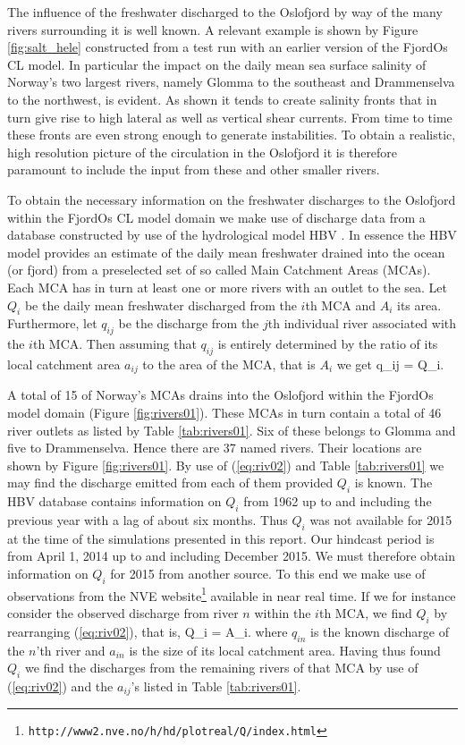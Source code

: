 The influence of the freshwater discharged to the Oslofjord by way of the many rivers surrounding it is well known. A relevant example is shown by Figure \ref{fig:salt_hele} constructed from a test run with an earlier version of the FjordOs CL model. In particular the impact on the daily mean sea surface salinity of Norway's two largest rivers, namely Glomma to the southeast and Drammenselva to the northwest, is evident. As shown it tends to create salinity fronts that in turn give rise to high lateral as well as vertical shear currents. From time to time these fronts are even strong enough to generate instabilities. To obtain a realistic, high resolution picture of the circulation in the Oslofjord it is therefore paramount to include the input from these and other smaller rivers.
 

To obtain the necessary information on the freshwater discharges to the Oslofjord within the FjordOs CL model domain we make use of discharge data from a database constructed by use of the hydrological model HBV \citep{beldr:etal:2003}. In essence the HBV model provides an estimate of the daily mean freshwater drained into the ocean (or fjord) from a preselected set of so called Main Catchment Areas (MCAs). Each MCA has in turn at least one or more rivers with an outlet to the sea. Let $Q_i$ be the daily mean freshwater discharged from the $i$th MCA and $A_i$ its area. Furthermore, let $q_{ij}$ be the discharge from the $j$th individual river associated with the $i$th MCA. Then assuming that $q_{ij}$ is entirely determined by the ratio of its local catchment area $a_{ij}$ to the area of the MCA, that is $A_i$ we get
\be
 \label{eq:riv02}
  q_{ij} =  Q_i.
\ee

A total of 15 of Norway's MCAs drains into the Oslofjord within the FjordOs model domain (Figure \ref{fig:rivers01}). These MCAs in turn contain a total of 46 river outlets as listed by Table \ref{tab:rivers01}. Six of these belongs to Glomma and five to Drammenselva. Hence there are 37 named rivers. Their locations are shown by Figure \ref{fig:rivers01}. By use of (\ref{eq:riv02}) and Table \ref{tab:rivers01} we may find the discharge emitted from each of them provided $Q_i$ is known. The HBV database contains information on $Q_i$ from 1962 up to and including the previous year with a lag of about six months. Thus $Q_i$ was not available for 2015 at the time of the simulations presented in this report. Our hindcast period is from April 1, 2014 up to and including December 2015. We must therefore obtain information on $Q_i$ for 2015 from another source. To this end we make use of observations from the NVE website\footnote{\texttt{http://www2.nve.no/h/hd/plotreal/Q/index.html}} available in near real time. If we for instance consider the observed discharge from river $n$ within the $i$th MCA, we find $Q_i$ by rearranging (\ref{eq:riv02}), that is,
\be
 \label{eq:riv03}
  Q_i = A_i.
\ee
where $q_{in}$ is the known discharge of the $n$'th river and $a_{in}$ is the size of its local catchment area. Having thus found $Q_i$ we find the discharges from the remaining rivers of that MCA by use of (\ref{eq:riv02}) and the $a_{ij}$'s listed in Table \ref{tab:rivers01}.

